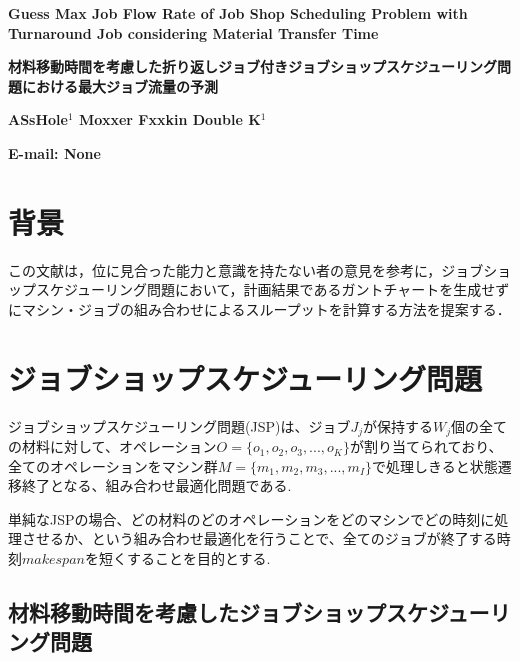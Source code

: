 \documentclass[a4j, 11pt]{ltjsarticle}
\begin{document}
\renewcommand{\baselinestretch}{1.12}\small\normalsize

\begin{center}
  \hspace{-10truemm}
  \begin{minipage}{150truemm}
    \begin{center}
      \textbf{\Large Guess Max Job Flow Rate of Job Shop Scheduling Problem with  Turnaround Job considering Material Transfer Time}

      \textbf{\large 材料移動時間を考慮した折り返しジョブ付きジョブショップスケジューリング問題における最大ジョブ流量の予測}

      \textbf{ASsHole$^1$
      Moxxer Fxxkin Double K$^1$}

      \textbf{E-mail: None}
    \end{center}
  \end{minipage}
\end{center}

\section{背景}

この文献は，位に見合った能力と意識を持たない者の意見を参考に，ジョブショップスケジューリング問題において，計画結果であるガントチャートを生成せずにマシン・ジョブの組み合わせによるスループットを計算する方法を提案する．

\section{ジョブショップスケジューリング問題}

ジョブショップスケジューリング問題(JSP)は、ジョブ$J_j$が保持する$W_j$個の全ての材料に対して、オペレーション$O = \{o_1, o_2, o_3, ..., o_K\}$が割り当てられており、全てのオペレーションをマシン群$M = \{m_1, m_2, m_3, ..., m_I\}$で処理しきると状態遷移終了となる、組み合わせ最適化問題である.

単純なJSPの場合、どの材料のどのオペレーションをどのマシンでどの時刻に処理させるか、という組み合わせ最適化を行うことで、全てのジョブが終了する時刻$makespan$を短くすることを目的とする.

\subsection{材料移動時間を考慮したジョブショップスケジューリング問題}
\end{document}
